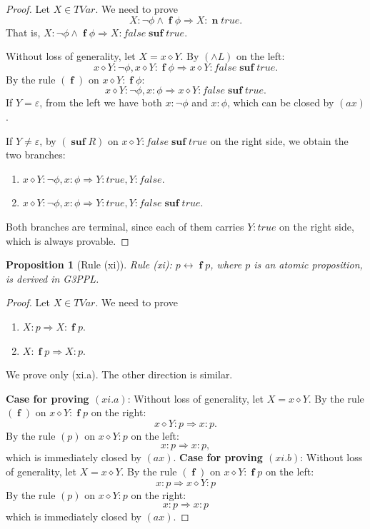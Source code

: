 \documentclass[manuscript,screen]{acmart}
\newtheorem{prop}{Proposition}[section]
\newcommand{\true}[0]{\mathit{true}}
\newcommand{\false}[0]{\mathit{false}}
\newcommand{\cat}[0]{\diamond}
\newcommand{\GiiiPPLcyc}[0]{\mbox{G3PPL}}
\DeclareMathOperator{\ofst}{\mathbf{f}}
\DeclareMathOperator{\osuf}{\mathbf{suf}}
\newcommand{\TVar}[0]{\textit{TVar}}
\DeclareMathOperator{\nxt}{\mathbf{n}}
\newcommand{\A}[1]{\mbox{ \textbf{#1} }}
\newcommand{\MO}{\A{MO}}
\newcommand{\EMO}{\A{EMO}}
\begin{document}
\begin{proof}

Let $X\in\TVar$. 
We need to prove
$$X : \neg\phi\wedge \ofst \phi\Rightarrow X : \nxt\true.$$
That is, $X : \neg\phi\wedge \ofst \phi\Rightarrow X : \false\osuf\true$.

Without loss of generality, let $X = x\cat Y$. 
By $(\wedge L)$ on the left:
$$
x\cat Y : \neg\phi, x\cat Y : \ofst \phi\Rightarrow x\cat Y : \false\osuf\true.
$$
By the rule $(\ofst)$ on $x\cat Y : \ofst\phi$:
$$
x\cat Y : \neg\phi, x : \phi\Rightarrow x\cat Y : \false\osuf\true.
$$
If $Y=\varepsilon$, from the left we have both $x : \neg\phi$ and $x : \phi$, which can be closed by $(ax)$. 

If $Y\neq \varepsilon$, 
by $(\osuf R)$ on $x\cat Y : \false\osuf\true$ on the right side, we obtain the two branches:
\begin{enumerate}
\item[(x.1)] $x\cat Y : \neg\phi, x : \phi\Rightarrow Y : \true, Y : \false$. 
\item[(x.2)] $x\cat Y : \neg\phi, x : \phi\Rightarrow Y : \true, Y : \false\osuf\true$. 
\end{enumerate}
Both branches are terminal, since each of them carries $Y : \true$ on the right side, which is always provable. 

\end{proof}

\begin{prop}[Rule (xi)]
Rule (xi): 
$p\leftrightarrow \ofst p$, where $p$ is an atomic proposition, 
is derived in \GiiiPPLcyc. 
\end{prop}

\begin{proof}
Let $X\in \TVar$. 
We need to prove
\begin{enumerate}
\item[$(xi.a)$] $X : p\Rightarrow X : \ofst p$.
\item[$(xi.b)$] $X : \ofst p\Rightarrow X : p$.
\end{enumerate}
We prove only (xi.a). The other direction is similar. 

\textbf{Case for proving $(xi.a)$}: 
Without loss of generality, let $X = x\cat Y$. By the rule $(\ofst)$ on $x\cat Y : \ofst p$ on the right:
$$
x\cat Y : p\Rightarrow x : p.
$$
By the rule $(p)$ on $x\cat Y : p$ on the left:
$$
x : p\Rightarrow x : p,
$$
which is immediately closed by $(\textit{ax})$.
\ifx
\textbf{Case for proving $(xi.b)$}: 
Without loss of generality, let $X = x\cat Y$. By the rule $(\ofst)$ on $x\cat Y : \ofst p$ on the left:
$$
x : p\Rightarrow x\cat Y : p
$$
By the rule $(p)$ on $x\cat Y : p$ on the right:
$$
x : p\Rightarrow x : p
$$
which is immediately closed by $(\textit{ax})$.
\fi
\end{proof}
\end{document}

